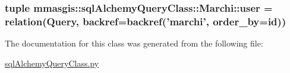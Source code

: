 \label{classmmasgis_1_1sqlAlchemyQueryClass_1_1Marchi_a693b33009554c00197dc7ec1b9f90dfa}
\hypertarget{classmmasgis_1_1sqlAlchemyQueryClass_1_1Marchi_aa8687bdceacf9ed56e60c93baf5ed38f}{
\subsubsection[{user}]{\setlength{\rightskip}{0pt plus 5cm}tuple {\bf mmasgis::sqlAlchemyQueryClass::Marchi::user} = relation({\bf Query}, backref=backref('marchi', order\_\-by={\bf id}))}}
\label{classmmasgis_1_1sqlAlchemyQueryClass_1_1Marchi_aa8687bdceacf9ed56e60c93baf5ed38f}


The documentation for this class was generated from the following file:\begin{DoxyCompactItemize}
\item 
\hyperlink{sqlAlchemyQueryClass_8py}{sqlAlchemyQueryClass.py}\end{DoxyCompactItemize}
